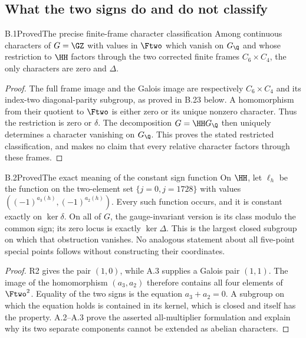 \subsection{What the two signs do and do not classify}

\begin{statement}{B.1}{Proved}{The precise finite-frame character classification}
Among continuous characters of $G=\GZ$ with values in $\Ftwo$
which vanish on $G_{\Q}$ and whose restriction to $\HH$ factors
through the two corrected finite frames $C_6\times C_4$, the
only characters are zero and $\Delta$.
\end{statement}
\begin{proof}
The full frame image and the Galois image are respectively
$C_6\times C_4$ and its index-two diagonal-parity subgroup,
as proved in B.23 below. A homomorphism from their quotient
to $\Ftwo$ is either zero or its unique nonzero character.
Thus the restriction is zero or $\delta$. The decomposition
$G=\HH G_{\Q}$ then uniquely determines a character
vanishing on $G_{\Q}$. This proves the stated restricted
classification, and makes no claim that every relative
character factors through these frames.
\end{proof}

\begin{statement}{B.2}{Proved}{The exact meaning of the constant sign function}
On $\HH$, let $\ell_h$ be the function on the two-element set
$\{j=0,j=1728\}$ with values
$((-1)^{a_3(h)},(-1)^{a_2(h)})$. Every such function occurs,
and it is constant exactly on $\ker\delta$.
On all of $G$, the gauge-invariant version is its class modulo
the common sign; its zero locus is exactly $\ker\Delta$.
This is the largest closed subgroup on which that obstruction
vanishes. No analogous statement about all five-point special
points follows without constructing their coordinates.
\end{statement}
\begin{proof}
R2 gives the pair $(1,0)$, while A.3 supplies a Galois pair
$(1,1)$. The image of the homomorphism $(a_3,a_2)$ therefore
contains all four elements of $\Ftwo^2$. Equality of the two
signs is the equation $a_3+a_2=0$. A subgroup on which the
equation holds is contained in its kernel, which is closed
and itself has the property. A.2--A.3 prove the asserted
all-multiplier formulation and explain why its two separate
components cannot be extended as abelian characters.
\end{proof}

